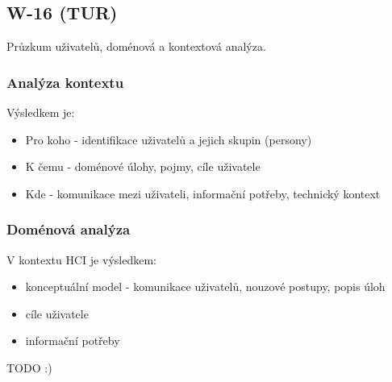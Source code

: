 \subsection{W-16 (TUR)}
Průzkum uživatelů, doménová a kontextová analýza.

\subsubsection*{Analýza kontextu}

Výsledkem je:
\begin{itemize}
  \item Pro koho - identifikace uživatelů a jejich skupin (persony)
  \item K čemu - doménové úlohy, pojmy, cíle uživatele
  \item Kde - komunikace mezi uživateli, informační potřeby, technický kontext
\end{itemize}

\subsubsection*{Doménová analýza}
V kontextu HCI je výsledkem:

\begin{itemize}
  \item konceptuální model - komunikace uživatelů, nouzové postupy, popis úloh
  \item cíle uživatele
  \item informační potřeby
\end{itemize}

TODO :)
